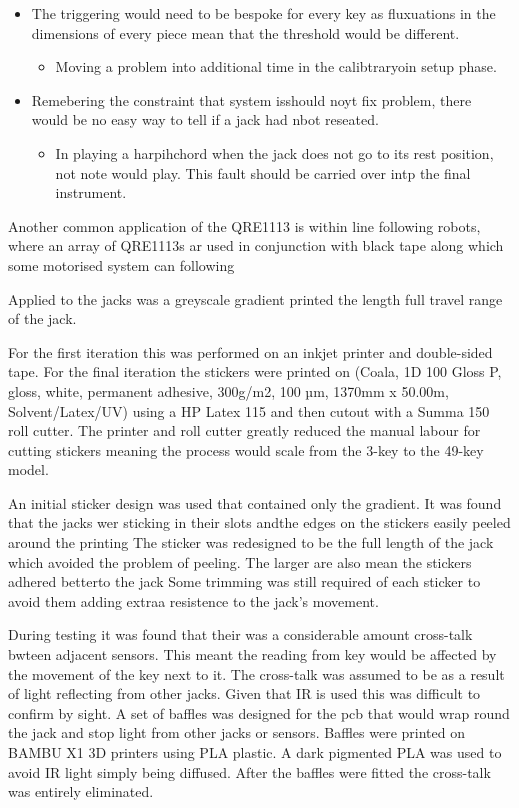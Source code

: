 \begin{itemize}
\item
  The triggering would need to be bespoke for every key as fluxuations
  in the dimensions of every piece mean that the threshold would be
  different.

  \begin{itemize}
  \item
    Moving a problem into additional time in the calibtraryoin setup
    phase.
  \end{itemize}
\item
  Remebering the constraint that system isshould noyt fix problem, there
  would be no easy way to tell if a jack had nbot reseated.

  \begin{itemize}
  \item
    In playing a harpihchord when the jack does not go to its rest
    position, not note would play. This fault should be carried over
    intp the final instrument.
  \end{itemize}
\end{itemize}

Another common application of the QRE1113 is within line following
robots, where an array of QRE1113s ar used in conjunction with black
tape along which some motorised system can following

Applied to the jacks was a greyscale gradient printed the length full
travel range of the jack.

For the first iteration this was performed on an inkjet printer and
double-sided tape. For the final iteration the stickers were printed on
(Coala, 1D 100 Gloss P, gloss, white, permanent adhesive, 300g/m2, 100
µm, 1370mm x 50.00m, Solvent/Latex/UV) using a HP Latex 115 and then
cutout with a Summa 150 roll cutter. The printer and roll cutter greatly
reduced the manual labour for cutting stickers meaning the process would
scale from the 3-key to the 49-key model.

An initial sticker design was used that contained only the gradient. It
was found that the jacks wer sticking in their slots andthe edges on the
stickers easily peeled around the printing The sticker was redesigned to
be the full length of the jack which avoided the problem of peeling. The
larger are also mean the stickers adhered betterto the jack Some
trimming was still required of each sticker to avoid them adding extraa
resistence to the jack's movement.

During testing it was found that their was a considerable amount
cross-talk bwteen adjacent sensors. This meant the reading from key
would be affected by the movement of the key next to it. The cross-talk
was assumed to be as a result of light reflecting from other jacks.
Given that IR is used this was difficult to confirm by sight. A set of
baffles was designed for the pcb that would wrap round the jack and stop
light from other jacks or sensors. Baffles were printed on BAMBU X1 3D
printers using PLA plastic. A dark pigmented PLA was used to avoid IR
light simply being diffused. After the baffles were fitted the
cross-talk was entirely eliminated.

